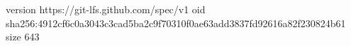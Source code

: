version https://git-lfs.github.com/spec/v1
oid sha256:4912cf6c0a3043c3cad5ba2c9f70310f0ae63add3837fd92616a82f230824b61
size 643
